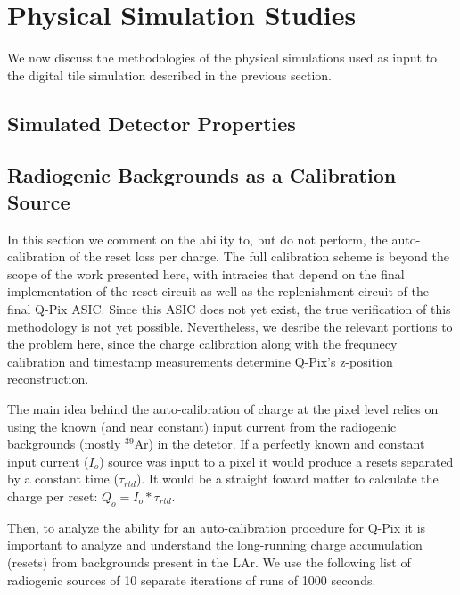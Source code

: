 \section{Physical Simulation Studies}

We now discuss the methodologies of the physical simulations used as input to the digital tile simulation described in the previous section.

\subsection{Simulated Detector Properties}


\subsection{Radiogenic Backgrounds as a Calibration Source}

In this section we comment on the ability to, but do not perform, the auto-calibration of the reset loss per charge.
The full calibration scheme is beyond the scope of the work presented here, with intracies that depend on the final implementation of the reset circuit as well as the replenishment circuit of the final Q-Pix ASIC.
Since this ASIC does not yet exist, the true verification of this methodology is not yet possible.
Nevertheless, we desribe the relevant portions to the problem here, since the charge calibration along with the frequnecy calibration and timestamp measurements determine Q-Pix's z-position reconstruction.

The main idea behind the auto-calibration of charge at the pixel level relies on using the known (and near constant) input current from the radiogenic backgrounds (mostly $^{39}$Ar) in the detetor. 
If a perfectly known and constant input current ($I_{o}$) source was input to a pixel it would produce a resets separated by a constant time ($\tau_{rtd}$).
It would be a straight foward matter to calculate the charge per reset: $Q_{o} = I_{o}*\tau_{rtd}$.

Then, to analyze the ability for an auto-calibration procedure for Q-Pix it is important to analyze and understand the long-running charge accumulation (resets) from backgrounds present in the LAr.
We use the following list of radiogenic sources of 10 separate iterations of runs of 1000 seconds.

